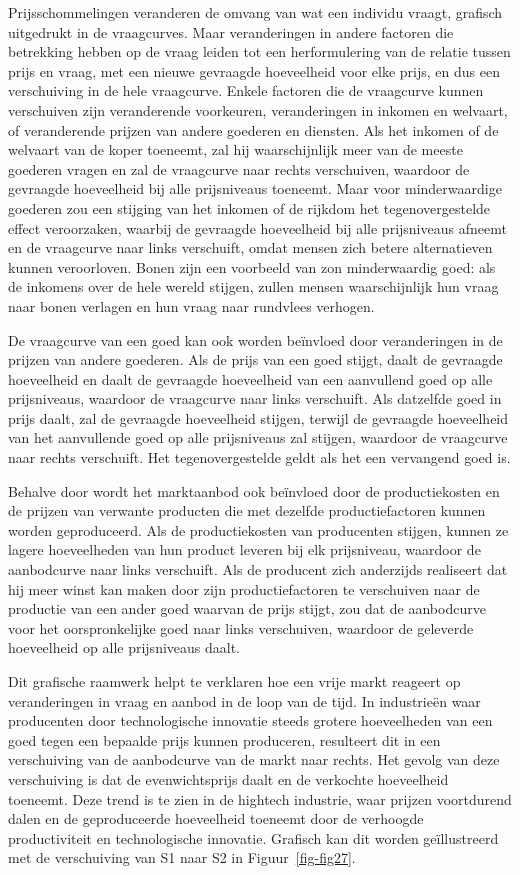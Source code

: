\documentclass[
  a5paper,
  smalldemyvopaper,11pt,twoside,onecolumn,openright,extrafontsizes,
hidelinks]{memoir}
\begin{document}
Prijsschommelingen veranderen de omvang van wat een individu vraagt,
grafisch uitgedrukt in de vraagcurves. Maar veranderingen in andere
factoren die betrekking hebben op de vraag leiden tot een herformulering
van de relatie tussen prijs en vraag, met een nieuwe gevraagde
hoeveelheid voor elke prijs, en dus een verschuiving in de hele
vraagcurve. Enkele factoren die de vraagcurve kunnen verschuiven zijn
veranderende voorkeuren, veranderingen in inkomen en welvaart, of
veranderende prijzen van andere goederen en diensten. Als het inkomen of
de welvaart van de koper toeneemt, zal hij waarschijnlijk meer van de
meeste goederen vragen en zal de vraagcurve naar rechts verschuiven,
waardoor de gevraagde hoeveelheid bij alle prijsniveaus toeneemt. Maar
voor minderwaardige goederen zou een stijging van het inkomen of de
rijkdom het tegenovergestelde effect veroorzaken, waarbij de gevraagde
hoeveelheid bij alle prijsniveaus afneemt en de vraagcurve naar links
verschuift, omdat mensen zich betere alternatieven kunnen veroorloven.
Bonen zijn een voorbeeld van zon minderwaardig goed: als de inkomens
over de hele wereld stijgen, zullen mensen waarschijnlijk hun vraag naar
bonen verlagen en hun vraag naar rundvlees verhogen.

De vraagcurve van een goed kan ook worden beïnvloed door veranderingen
in de prijzen van andere goederen. Als de prijs van een goed stijgt,
daalt de gevraagde hoeveelheid en daalt de gevraagde hoeveelheid van een
aanvullend goed op alle prijsniveaus, waardoor de vraagcurve naar links
verschuift. Als datzelfde goed in prijs daalt, zal de gevraagde
hoeveelheid stijgen, terwijl de gevraagde hoeveelheid van het
aanvullende goed op alle prijsniveaus zal stijgen, waardoor de
vraagcurve naar rechts verschuift. Het tegenovergestelde geldt als het
een vervangend goed is.

Behalve door wordt het marktaanbod ook beïnvloed door de productiekosten
en de prijzen van verwante producten die met dezelfde productiefactoren
kunnen worden geproduceerd. Als de productiekosten van producenten
stijgen, kunnen ze lagere hoeveelheden van hun product leveren bij elk
prijsniveau, waardoor de aanbodcurve naar links verschuift. Als de
producent zich anderzijds realiseert dat hij meer winst kan maken door
zijn productiefactoren te verschuiven naar de productie van een ander
goed waarvan de prijs stijgt, zou dat de aanbodcurve voor het
oorspronkelijke goed naar links verschuiven, waardoor de geleverde
hoeveelheid op alle prijsniveaus daalt.

Dit grafische raamwerk helpt te verklaren hoe een vrije markt reageert
op veranderingen in vraag en aanbod in de loop van de tijd. In
industrieën waar producenten door technologische innovatie steeds
grotere hoeveelheden van een goed tegen een bepaalde prijs kunnen
produceren, resulteert dit in een verschuiving van de aanbodcurve van de
markt naar rechts. Het gevolg van deze verschuiving is dat de
evenwichtsprijs daalt en de verkochte hoeveelheid toeneemt. Deze trend
is te zien in de hightech industrie, waar prijzen voortdurend dalen en
de geproduceerde hoeveelheid toeneemt door de verhoogde productiviteit
en technologische innovatie. Grafisch kan dit worden geïllustreerd met
de verschuiving van S1 naar S2 in Figuur~\ref{fig-fig27}.
\end{document}
